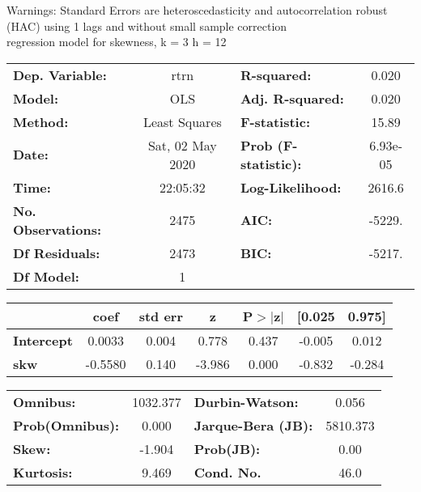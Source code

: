 Warnings: \newline
 [1] Standard Errors are heteroscedasticity and autocorrelation robust (HAC) using 1 lags and without small sample correction\\ 

regression model for skewness, k = 3 h = 12\begin{center}
\begin{tabular}{lclc}
\toprule
\textbf{Dep. Variable:}    &       rtrn       & \textbf{  R-squared:         } &     0.020   \\
\textbf{Model:}            &       OLS        & \textbf{  Adj. R-squared:    } &     0.020   \\
\textbf{Method:}           &  Least Squares   & \textbf{  F-statistic:       } &     15.89   \\
\textbf{Date:}             & Sat, 02 May 2020 & \textbf{  Prob (F-statistic):} &  6.93e-05   \\
\textbf{Time:}             &     22:05:32     & \textbf{  Log-Likelihood:    } &    2616.6   \\
\textbf{No. Observations:} &        2475      & \textbf{  AIC:               } &    -5229.   \\
\textbf{Df Residuals:}     &        2473      & \textbf{  BIC:               } &    -5217.   \\
\textbf{Df Model:}         &           1      & \textbf{                     } &             \\
\bottomrule
\end{tabular}
\begin{tabular}{lcccccc}
                   & \textbf{coef} & \textbf{std err} & \textbf{z} & \textbf{P$> |$z$|$} & \textbf{[0.025} & \textbf{0.975]}  \\
\midrule
\textbf{Intercept} &       0.0033  &        0.004     &     0.778  &         0.437        &       -0.005    &        0.012     \\
\textbf{skw}       &      -0.5580  &        0.140     &    -3.986  &         0.000        &       -0.832    &       -0.284     \\
\bottomrule
\end{tabular}
\begin{tabular}{lclc}
\textbf{Omnibus:}       & 1032.377 & \textbf{  Durbin-Watson:     } &    0.056  \\
\textbf{Prob(Omnibus):} &   0.000  & \textbf{  Jarque-Bera (JB):  } & 5810.373  \\
\textbf{Skew:}          &  -1.904  & \textbf{  Prob(JB):          } &     0.00  \\
\textbf{Kurtosis:}      &   9.469  & \textbf{  Cond. No.          } &     46.0  \\
\bottomrule
\end{tabular}
\end{center}

